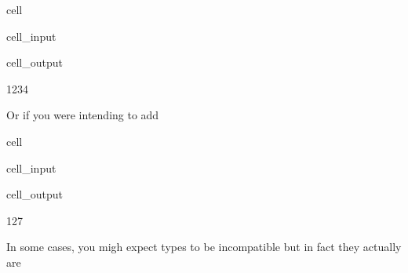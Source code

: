 \documentclass[letterpaper,10pt,english]{jupyterBook}
\begin{document}
\begin{sphinxuseclass}{cell}\begin{sphinxVerbatimInput}

\begin{sphinxuseclass}{cell_input}
\begin{sphinxVerbatim}[commandchars=\\\{\}]
  
\end{sphinxVerbatim}

\end{sphinxuseclass}\end{sphinxVerbatimInput}
\begin{sphinxVerbatimOutput}

\begin{sphinxuseclass}{cell_output}
\begin{sphinxVerbatim}[commandchars=\\\{\}]
\PYGZsq{}1234\PYGZsq{}
\end{sphinxVerbatim}

\end{sphinxuseclass}\end{sphinxVerbatimOutput}

\end{sphinxuseclass}
\sphinxAtStartPar
Or if you were intending to add

\begin{sphinxuseclass}{cell}\begin{sphinxVerbatimInput}

\begin{sphinxuseclass}{cell_input}
\begin{sphinxVerbatim}[commandchars=\\\{\}]
  
\end{sphinxVerbatim}

\end{sphinxuseclass}\end{sphinxVerbatimInput}
\begin{sphinxVerbatimOutput}

\begin{sphinxuseclass}{cell_output}
\begin{sphinxVerbatim}[commandchars=\\\{\}]
127
\end{sphinxVerbatim}

\end{sphinxuseclass}\end{sphinxVerbatimOutput}

\end{sphinxuseclass}
\sphinxAtStartPar
In some cases, you migh expect types to be incompatible but in fact they actually are
\end{document}
